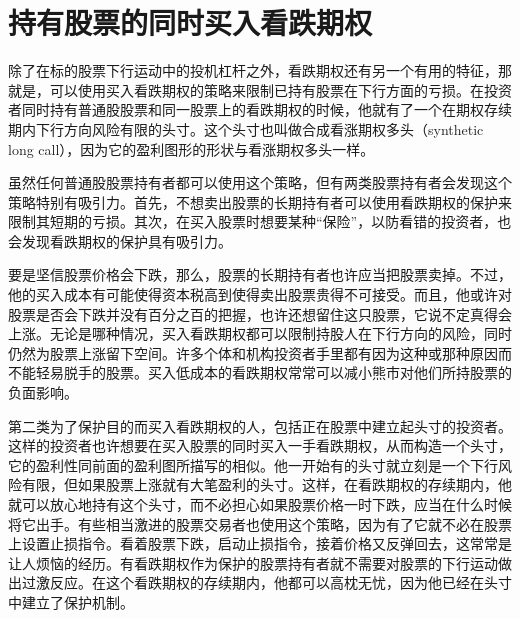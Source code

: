 \chapter{持有股票的同时买入看跌期权}
除了在标的股票下行运动中的投机杠杆之外，看跌期权还有另一个有用的特征，那就是，可以使用买入看跌期权的策略来限制已持有股票在下行方面的亏损。在投资者同时持有普通股股票和同一股票上的看跌期权的时候，他就有了一个在期权存续期内下行方向风险有限的头寸。这个头寸也叫做合成看涨期权多头（synthetic long call），因为它的盈利图形的形状与看涨期权多头一样。

虽然任何普通股股票持有者都可以使用这个策略，但有两类股票持有者会发现这个策略特别有吸引力。首先，不想卖出股票的长期持有者可以使用看跌期权的保护来限制其短期的亏损。其次，在买入股票时想要某种“保险”，以防看错的投资者，也会发现看跌期权的保护具有吸引力。

要是坚信股票价格会下跌，那么，股票的长期持有者也许应当把股票卖掉。不过，他的买入成本有可能使得资本税高到使得卖出股票贵得不可接受。而且，他或许对股票是否会下跌并没有百分之百的把握，也许还想留住这只股票，它说不定真得会上涨。无论是哪种情况，买入看跌期权都可以限制持股人在下行方向的风险，同时仍然为股票上涨留下空间。许多个体和机构投资者手里都有因为这种或那种原因而不能轻易脱手的股票。买入低成本的看跌期权常常可以减小熊市对他们所持股票的负面影响。

第二类为了保护目的而买入看跌期权的人，包括正在股票中建立起头寸的投资者。这样的投资者也许想要在买入股票的同时买入一手看跌期权，从而构造一个头寸，它的盈利性同前面的盈利图所描写的相似。他一开始有的头寸就立刻是一个下行风险有限，但如果股票上涨就有大笔盈利的头寸。这样，在看跌期权的存续期内，他就可以放心地持有这个头寸，而不必担心如果股票价格一时下跌，应当在什么时候将它出手。有些相当激进的股票交易者也使用这个策略，因为有了它就不必在股票上设置止损指令。看着股票下跌，启动止损指令，接着价格又反弹回去，这常常是让人烦恼的经历。有看跌期权作为保护的股票持有者就不需要对股票的下行运动做出过激反应。在这个看跌期权的存续期内，他都可以高枕无忧，因为他已经在头寸中建立了保护机制。